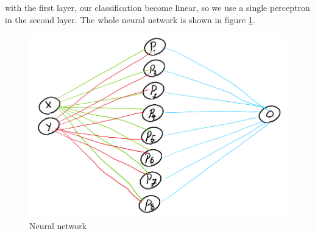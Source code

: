 \documentclass[en]{university}
\begin{document}
with the first layer, our classification become linear, so we use a single perceptron in the second layer. The whole neural network 
is shown in figure \ref{fig:n}.

\begin{figure}
\centering
\includegraphics[width=1\textwidth]{assets/3n.png}
\caption{Neural network}
\label{fig:n}
\end{figure}
\end{document}

